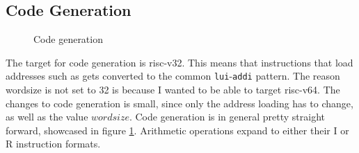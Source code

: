 %                 

\subsection{Code Generation}\label{sec:lan-codegen}
\begin{figure}
    
    \caption{Code generation}
    \label{fig:codegen}
\end{figure}
The target for code generation is risc-v32. This means that instructions that
load addresses such as \mvscratch gets converted to the common
\texttt{lui}-\texttt{addi} pattern.
The reason wordsize is not set to 32 is because I wanted to be able to target
risc-v64. The changes to code generation is small, since only the address
loading has to change, as well as the value $wordsize$.
Code generation is in general pretty straight forward, showcased in figure
\ref{fig:codegen}.
Arithmetic operations expand to either their I or R instruction
formats\cite{cod}.

